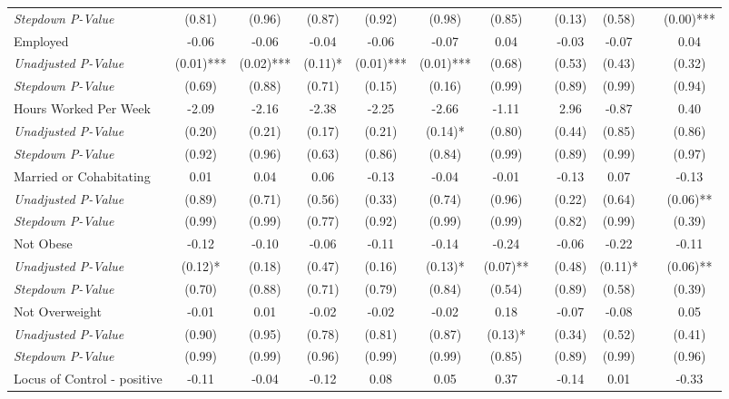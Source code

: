 \begin{tabular}{l c c c c c c c c c c c}
\quad \textit{Stepdown P-Value} & (0.81) & (0.96) & (0.87) & (0.92) & (0.98) & (0.85) & & (0.13) & (0.58) & & (0.00)*** \\
Employed & -0.06 & -0.06 & -0.04 & -0.06 & -0.07 & 0.04 & & -0.03 & -0.07 & & 0.04 \\
\quad \textit{Unadjusted P-Value} & (0.01)*** & (0.02)*** & (0.11)* & (0.01)*** & (0.01)*** & (0.68) & & (0.53) & (0.43) & & (0.32) \\
\quad \textit{Stepdown P-Value} & (0.69) & (0.88) & (0.71) & (0.15) & (0.16) & (0.99) & & (0.89) & (0.99) & & (0.94) \\
Hours Worked Per Week & -2.09 & -2.16 & -2.38 & -2.25 & -2.66 & -1.11 & & 2.96 & -0.87 & & 0.40 \\
\quad \textit{Unadjusted P-Value} & (0.20) & (0.21) & (0.17) & (0.21) & (0.14)* & (0.80) & & (0.44) & (0.85) & & (0.86) \\
\quad \textit{Stepdown P-Value} & (0.92) & (0.96) & (0.63) & (0.86) & (0.84) & (0.99) & & (0.89) & (0.99) & & (0.97) \\
Married or Cohabitating & 0.01 & 0.04 & 0.06 & -0.13 & -0.04 & -0.01 & & -0.13 & 0.07 & & -0.13 \\
\quad \textit{Unadjusted P-Value} & (0.89) & (0.71) & (0.56) & (0.33) & (0.74) & (0.96) & & (0.22) & (0.64) & & (0.06)** \\
\quad \textit{Stepdown P-Value} & (0.99) & (0.99) & (0.77) & (0.92) & (0.99) & (0.99) & & (0.82) & (0.99) & & (0.39) \\
Not Obese & -0.12 & -0.10 & -0.06 & -0.11 & -0.14 & -0.24 & & -0.06 & -0.22 & & -0.11 \\
\quad \textit{Unadjusted P-Value} & (0.12)* & (0.18) & (0.47) & (0.16) & (0.13)* & (0.07)** & & (0.48) & (0.11)* & & (0.06)** \\
\quad \textit{Stepdown P-Value} & (0.70) & (0.88) & (0.71) & (0.79) & (0.84) & (0.54) & & (0.89) & (0.58) & & (0.39) \\
Not Overweight & -0.01 & 0.01 & -0.02 & -0.02 & -0.02 & 0.18 & & -0.07 & -0.08 & & 0.05 \\
\quad \textit{Unadjusted P-Value} & (0.90) & (0.95) & (0.78) & (0.81) & (0.87) & (0.13)* & & (0.34) & (0.52) & & (0.41) \\
\quad \textit{Stepdown P-Value} & (0.99) & (0.99) & (0.96) & (0.99) & (0.99) & (0.85) & & (0.89) & (0.99) & & (0.96) \\
Locus of Control - positive & -0.11 & -0.04 & -0.12 & 0.08 & 0.05 & 0.37 & & -0.14 & 0.01 & & -0.33 \\

\end{tabular}
